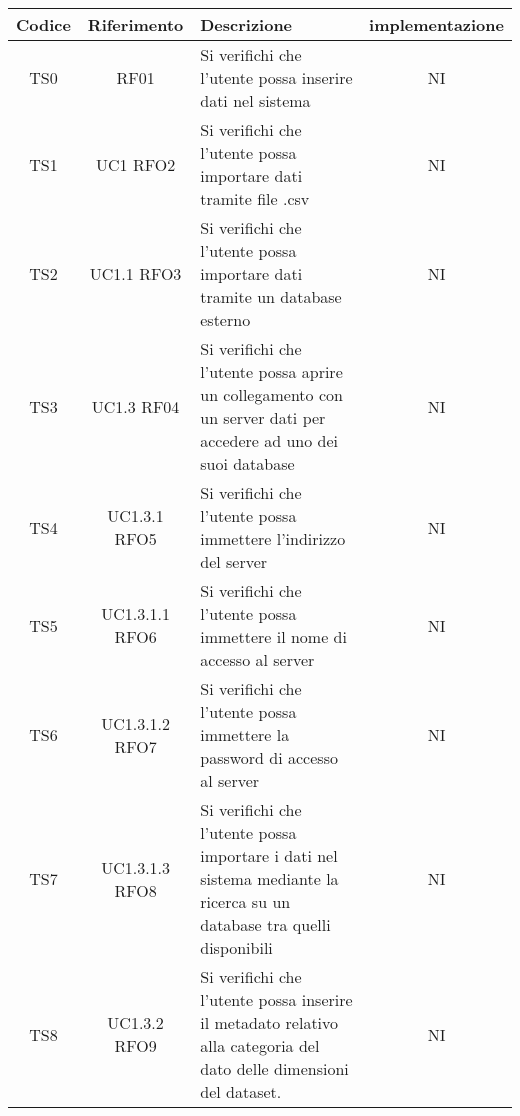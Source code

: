 \documentclass[../piano_di_qualifica.tex]{subfiles}
\begin{document}
\begin{center}
	\begin{longtable}{|c|c|p{8.5cm}|c|}
		\hline
		\rowcolor{lightgray}
		{\textbf{Codice}} & {\textbf{Riferimento}} & {\textbf{Descrizione}}                                                                                                 & {\textbf{implementazione}} \\
		\hline
		TS0               & RF01                   & Si verifichi che l'utente possa inserire dati nel sistema                                                              & NI                         \\ \hline
		TS1               & UC1 RFO2               & Si verifichi che l'utente possa importare dati tramite file .csv                                                       & NI                         \\ \hline
		TS2               & UC1.1 RFO3             & Si verifichi che l'utente possa importare dati tramite un database esterno                                             & NI                         \\ \hline
		TS3               & UC1.3 RF04             & Si verifichi che l'utente possa aprire un collegamento con un server dati per accedere ad uno dei suoi database        & NI                         \\ \hline
		TS4               & UC1.3.1 RFO5           & Si verifichi che l’utente possa immettere l’indirizzo del server                                                       & NI                         \\ \hline
		TS5               & UC1.3.1.1 RFO6         & Si verifichi che l’utente possa immettere il nome di accesso al server                                                 & NI                         \\ \hline
		TS6               & UC1.3.1.2 RFO7         & Si verifichi che l’utente possa immettere la password di accesso al server                                             & NI                         \\ \hline
		TS7               & UC1.3.1.3 RFO8         & Si verifichi che l’utente possa importare i dati nel sistema mediante la ricerca su un database tra quelli disponibili & NI                         \\ \hline
		TS8               & UC1.3.2 RFO9           & Si verifichi che l’utente possa inserire il metadato relativo alla categoria del dato delle dimensioni del dataset.    & NI                         \\ \hline

\end{longtable}
\end{center}
\end{document}
